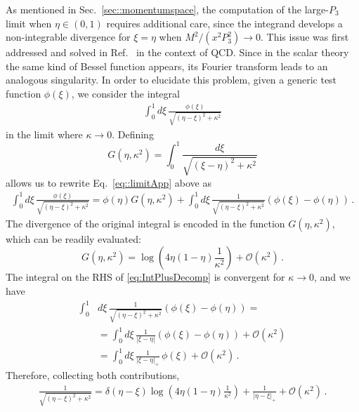 As mentioned in Sec.~\ref{sec::momentumspace}, the computation of the
large-$P_3$ limit when $\eta \in \left(0,1\right)$ requires additional care,
since the integrand develops a non-integrable divergence for $\xi=\eta$ when
$M^2/(x^2P_3^2) \to 0$. This issue was first addressed and solved in Ref.~\cite{Radyushkin:2017lvu} in the context of QCD.
Since in the scalar theory the same kind of Bessel function appears, its Fourier transform leads to an analogous singularity. 
In order to elucidate this problem, given a generic test
function $\phi\left(\xi\right)$, we consider the integral
\begin{align}
    \label{eq::limitApp}
        \int_0^1 d\xi\,
        \frac{\phi\left(\xi\right)}{\sqrt{\left(\eta-\xi\right)^2 + \kappa^2}}
\end{align}
in the limit where $\kappa\to 0$. Defining 
\begin{equation}
    \label{eq:GfunDef}
    G\left(\eta, \kappa^2\right) = 
    \int_0^1 \frac{d\xi}{\sqrt{\left(\xi - \eta\right)^2 + \kappa^2}}
\end{equation}
allows us to rewrite Eq.~\ref{eq::limitApp} above as 
\begin{align}
    \label{eq:IntPlusDecomp}
    \int_0^1 d\xi\,
    \frac{\phi\left(\xi\right)}{\sqrt{\left(\eta-\xi\right)^2 + \kappa^2}}
    = \phi(\eta) G\left(\eta, \kappa^2\right) + 
    \int_0^1 d\xi\,
    \frac{1}{\sqrt{\left(\eta-\xi\right)^2 + \kappa^2}}
    \left(\phi\left(\xi\right)-\phi\left(\eta\right)\right)\, .
\end{align}
The divergence of the original integral is encoded in the function
$G\left(\eta,\kappa^2\right)$, which can be readily evaluated:
\begin{equation}
    \label{eq:GfunIntegral}
    G\left(\eta, \kappa^2\right) =
    \log \left(4\eta\left(1-\eta\right)\frac{1}{\kappa^2}\right) +
    \mathcal O\left(\kappa^2\right)\, .
\end{equation}
The integral on the RHS of \eqref{eq:IntPlusDecomp} is convergent for $\kappa\to
0$, and we have
\begin{align}
    \int_0^1 & d\xi\, 
    \frac{1}{\sqrt{\left(\eta-\xi\right)^2 + \kappa^2}} 
    \left(\phi\left(\xi\right)-\phi\left(\eta\right)\right) = 
    \nonumber \\
    &= \int_0^1 d\xi\, 
    \frac{1}{\left| \xi - \eta\right|}
    \left(\phi\left(\xi\right)-\phi\left(\eta\right)\right) 
    + \mathcal{O}(\kappa^2) \nonumber \\
    \label{eq:PlusDistrLimit}
    &= \int_0^1 d\xi\,
    \frac{1}{\left| \xi - \eta\right|_+}\,
    \phi\left(\xi\right) 
    + \mathcal{O}(\kappa^2) \, .
\end{align}
Therefore, collecting both contributions, 
\begin{align}
    \frac{1}{\sqrt{(\eta - \xi)^2 + \kappa^2}} = 
    \delta(\eta - \xi) \log\left(4\eta (1-\eta) \frac{1}{\kappa^2}\right)
    + \frac{1}{\left|\eta - \xi\right|_+} + \mathcal{O}\left(\kappa^2\right)\, .
\end{align}

